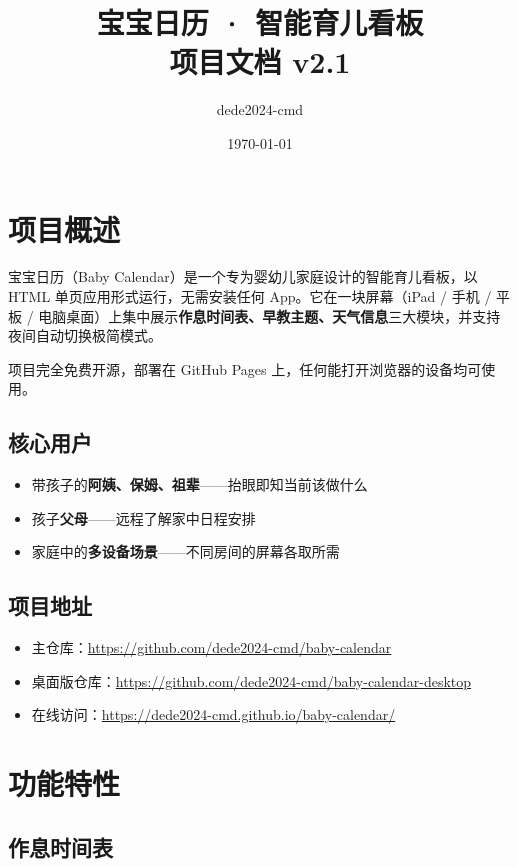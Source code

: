 \documentclass[12pt,a4paper,fontset=fandol]{ctexart}
\title{\textbf{宝宝日历 · 智能育儿看板}\\[4pt]\large 项目文档 v2.1}
\author{dede2024-cmd}
\date{\today}
\begin{document}
\maketitle
\thispagestyle{empty}
\newpage

\tableofcontents
\newpage

\section{项目概述}

宝宝日历（Baby Calendar）是一个专为婴幼儿家庭设计的智能育儿看板，以 HTML 单页应用形式运行，无需安装任何 App。它在一块屏幕（iPad / 手机 / 平板 / 电脑桌面）上集中展示\textbf{作息时间表、早教主题、天气信息}三大模块，并支持夜间自动切换极简模式。

项目完全免费开源，部署在 GitHub Pages 上，任何能打开浏览器的设备均可使用。

\subsection{核心用户}

\begin{itemize}
    \item 带孩子的\textbf{阿姨、保姆、祖辈}——抬眼即知当前该做什么
    \item 孩子\textbf{父母}——远程了解家中日程安排
    \item 家庭中的\textbf{多设备场景}——不同房间的屏幕各取所需
\end{itemize}

\subsection{项目地址}

\begin{itemize}
    \item 主仓库：\url{https://github.com/dede2024-cmd/baby-calendar}
    \item 桌面版仓库：\url{https://github.com/dede2024-cmd/baby-calendar-desktop}
    \item 在线访问：\url{https://dede2024-cmd.github.io/baby-calendar/}
\end{itemize}

\section{功能特性}

\subsection{作息时间表}
\end{document}

